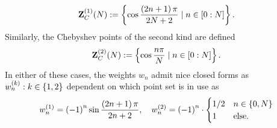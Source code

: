 \documentclass[12pt, oneside]{amsart}
\theoremstyle{definition}
\theoremstyle{remark}
\numberwithin{equation}{section}
\begin{document}
\begin{equation}\label{eq:chebyPts1}
    \ZZ_C^{(1)}(N) \defn 
    \set{\cos \frac{\left(2n+1\right) \pi}{2N+2} \mid n \in 
    \indexset[0]{N}}.
\end{equation}
Similarly, the Chebyshev points of the second kind are defined
\begin{equation}\label{eq:chebyPts2}
    \ZZ_C^{(2)}(N) \defn
    \set{\cos \frac{n\pi}{N} \mid n \in \indexset[0]{N}}.
\end{equation}
In either of these cases, the weights \(w_n\) admit nice closed forms as \(w_n^{(k)}: k \in \set{1,2}\) dependent on which point set is in use as
\begin{equation}\label{eq:weightsChebyshev}
    w_n^{(1)} = {\left(-1\right)}^n \sin \frac{\left(2n+1\right) \pi}{2n+2}, \quad w_n^{(2)} = {\left(-1\right)}^n \cdot \begin{cases}
        1/2 &n \in \set{0, N}\\
        1 &\text{else.}
    \end{cases}
\end{equation}
\end{document}
